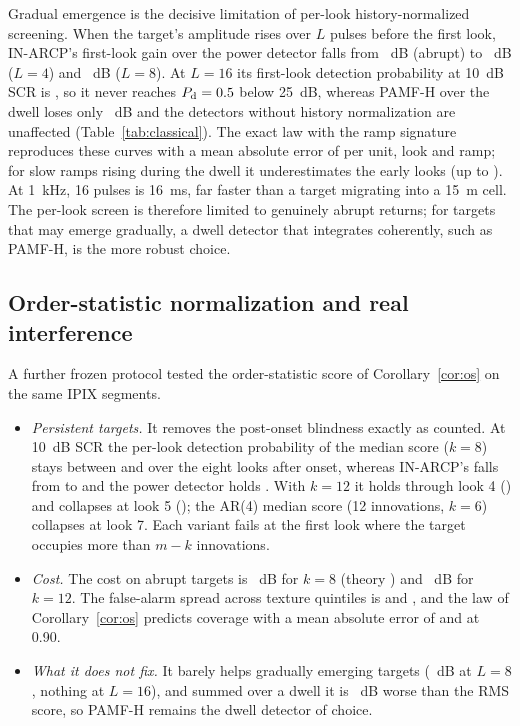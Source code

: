 \documentclass[journal]{IEEEtran}
\begin{document}
Gradual emergence is the decisive limitation of per-look history-normalized screening. When the target's amplitude rises over $L$ pulses before the first look, IN-ARCP's first-look gain over the power detector falls from \RampGainOne~dB (abrupt) to \RampGainFour~dB ($L=4$) and \RampGainEight~dB ($L=8$). At $L=16$ its first-look detection probability at 10~dB SCR is \RampPdSixteen, so it never reaches $P_{\rm d}=0.5$ below 25~dB, whereas PAMF-H over the dwell loses only \RampPAMFLoss~dB and the detectors without history normalization are unaffected (Table~\ref{tab:classical}). The exact law with the ramp signature reproduces these curves with a mean absolute error of \RampMae{} per unit, look and ramp; for slow ramps rising during the dwell it underestimates the early looks (up to \RampMaeWorst). At 1~kHz, 16 pulses is 16~ms, far faster than a target migrating into a 15~m cell. The per-look screen is therefore limited to genuinely abrupt returns; for targets that may emerge gradually, a dwell detector that integrates coherently, such as PAMF-H, is the more robust choice.

\subsection{Order-statistic normalization and real interference}\label{sec:os}
A further frozen protocol tested the order-statistic score of Corollary~\ref{cor:os} on the same IPIX segments.
\begin{itemize}[leftmargin=*,itemsep=1pt]
\item \emph{Persistent targets.} It removes the post-onset blindness exactly as counted. At 10~dB SCR the per-look detection probability of the median score ($k=8$) stays between \OsPersFirst{} and \OsPersLast{} over the eight looks after onset, whereas IN-ARCP's falls from \OnLookZero{} to \InPersLast{} and the power detector holds \OnCAloc. With $k=12$ it holds through look 4 (\OsTwelveLookFour) and collapses at look 5 (\OsTwelveLookFive); the AR(4) median score (12 innovations, $k=6$) collapses at look 7. Each variant fails at the first look where the target occupies more than $m-k$ innovations.
\item \emph{Cost.} The cost on abrupt targets is \OsCostEight~dB for $k=8$ (theory \OSLossEight) and \OsCostTwelve~dB for $k=12$. The false-alarm spread across texture quintiles is \OsSpreadEight{} and \OsSpreadTwelve, and the law of Corollary~\ref{cor:os} predicts coverage with a mean absolute error of \OsLawEight{} and \OsLawTwelve{} at 0.90.
\item \emph{What it does not fix.} It barely helps gradually emerging targets (\OsRampGain~dB at $L=8$, nothing at $L=16$), and summed over a dwell it is \OsDwellWorse~dB worse than the RMS score, so PAMF-H remains the dwell detector of choice.
\end{itemize}
\end{document}
